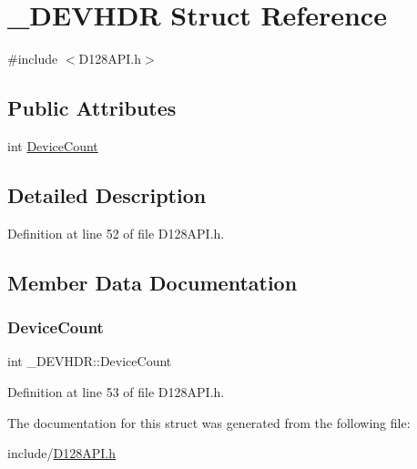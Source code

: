 \hypertarget{struct___d_e_v_h_d_r}{}\section{\+\_\+\+D\+E\+V\+H\+DR Struct Reference}
\label{struct___d_e_v_h_d_r}


{\ttfamily \#include $<$D128\+A\+P\+I.\+h$>$}

\subsection*{Public Attributes}
\begin{DoxyCompactItemize}
\item 
int \hyperlink{struct___d_e_v_h_d_r_a597655230495775fdfcf1d73b95ec7d0}{Device\+Count}
\end{DoxyCompactItemize}


\subsection{Detailed Description}


Definition at line 52 of file D128\+A\+P\+I.\+h.



\subsection{Member Data Documentation}
\mbox{\label{struct___d_e_v_h_d_r_a597655230495775fdfcf1d73b95ec7d0}} 
\subsubsection{\texorpdfstring{Device\+Count}{DeviceCount}}
{\footnotesize\ttfamily int \+\_\+\+D\+E\+V\+H\+D\+R\+::\+Device\+Count}



Definition at line 53 of file D128\+A\+P\+I.\+h.



The documentation for this struct was generated from the following file\+:\begin{DoxyCompactItemize}
\item 
include/\hyperlink{_d128_a_p_i_8h}{D128\+A\+P\+I.\+h}\end{DoxyCompactItemize}
